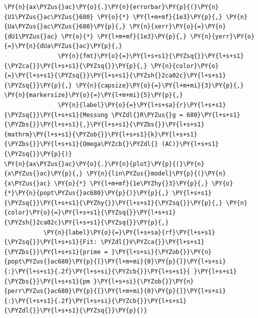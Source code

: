 \begin{tcolorbox}[breakable, size=fbox, boxrule=1pt, pad at break*=1mm,colback=cellbackground, colframe=cellborder]
\begin{Verbatim}[commandchars=\\\{\}]
\PY{n}{ax\PYZus{}ac}\PY{o}{.}\PY{n}{errorbar}\PY{p}{(}\PY{n}{U1\PYZus{}ac\PYZus{}680} \PY{o}{*} \PY{l+m+mf}{1e3}\PY{p}{,} \PY{n}{Ua\PYZus{}ac\PYZus{}680}\PY{p}{,} \PY{n}{xerr}\PY{o}{=}\PY{n}{dU1\PYZus{}ac} \PY{o}{*} \PY{l+m+mf}{1e3}\PY{p}{,} \PY{n}{yerr}\PY{o}{=}\PY{n}{dUa\PYZus{}ac}\PY{p}{,}
               \PY{n}{fmt}\PY{o}{=}\PY{l+s+s1}{\PYZsq{}}\PY{l+s+s1}{\PYZca{}}\PY{l+s+s1}{\PYZsq{}}\PY{p}{,} \PY{n}{color}\PY{o}{=}\PY{l+s+s1}{\PYZsq{}}\PY{l+s+s1}{\PYZsh{}2ca02c}\PY{l+s+s1}{\PYZsq{}}\PY{p}{,} \PY{n}{capsize}\PY{o}{=}\PY{l+m+mi}{3}\PY{p}{,} \PY{n}{markersize}\PY{o}{=}\PY{l+m+mi}{5}\PY{p}{,}
               \PY{n}{label}\PY{o}{=}\PY{l+s+sa}{r}\PY{l+s+s1}{\PYZsq{}}\PY{l+s+s1}{Messung \PYZdl{}R\PYZus{}g = 680}\PY{l+s+s1}{\PYZbs{}}\PY{l+s+s1}{,}\PY{l+s+s1}{\PYZbs{}}\PY{l+s+s1}{mathrm}\PY{l+s+s1}{\PYZob{}}\PY{l+s+s1}{k}\PY{l+s+s1}{\PYZbs{}}\PY{l+s+s1}{Omega\PYZcb{}\PYZdl{} (AC)}\PY{l+s+s1}{\PYZsq{}}\PY{p}{)}
\PY{n}{ax\PYZus{}ac}\PY{o}{.}\PY{n}{plot}\PY{p}{(}\PY{n}{x\PYZus{}ac}\PY{p}{,} \PY{n}{lin\PYZus{}model}\PY{p}{(}\PY{n}{x\PYZus{}ac} \PY{o}{*} \PY{l+m+mf}{1e\PYZhy{}3}\PY{p}{,} \PY{o}{*}\PY{n}{popt\PYZus{}ac680}\PY{p}{)}\PY{p}{,} \PY{l+s+s1}{\PYZsq{}}\PY{l+s+s1}{\PYZhy{}}\PY{l+s+s1}{\PYZsq{}}\PY{p}{,} \PY{n}{color}\PY{o}{=}\PY{l+s+s1}{\PYZsq{}}\PY{l+s+s1}{\PYZsh{}2ca02c}\PY{l+s+s1}{\PYZsq{}}\PY{p}{,}
           \PY{n}{label}\PY{o}{=}\PY{l+s+sa}{rf}\PY{l+s+s1}{\PYZsq{}}\PY{l+s+s1}{Fit: \PYZdl{}V\PYZca{}}\PY{l+s+s1}{\PYZbs{}}\PY{l+s+s1}{prime = }\PY{l+s+si}{\PYZob{}}\PY{n}{popt\PYZus{}ac680}\PY{p}{[}\PY{l+m+mi}{0}\PY{p}{]}\PY{l+s+si}{:}\PY{l+s+s1}{.2f}\PY{l+s+si}{\PYZcb{}}\PY{l+s+s1}{ }\PY{l+s+s1}{\PYZbs{}}\PY{l+s+s1}{pm }\PY{l+s+si}{\PYZob{}}\PY{n}{perr\PYZus{}ac680}\PY{p}{[}\PY{l+m+mi}{0}\PY{p}{]}\PY{l+s+si}{:}\PY{l+s+s1}{.2f}\PY{l+s+si}{\PYZcb{}}\PY{l+s+s1}{\PYZdl{}}\PY{l+s+s1}{\PYZsq{}}\PY{p}{)}


\end{Verbatim}
\end{tcolorbox}
